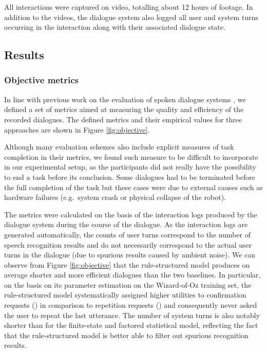 All interactions were captured on video, totalling about 12 hours of footage. In addition to the videos, the dialogue system also logged all user and system turns occurring in the interaction along with their associated dialogue state.


\subsection{Results}
\label{sec:results-exp3}

\subsubsection*{Objective metrics}

In line with previous work on the evaluation of spoken dialogue systems \citep[see e.g.][ch. 6 for an overview]{2009Jokinen}, we defined a set of metrics aimed at measuring the quality and efficiency of the recorded dialogues.  The defined metrics and their empirical values for three approaches are shown in Figure \ref{fig:objective}.

Although many evaluation schemes also include explicit measures of task completion in their metrics, we found such measure to be difficult to incorporate in our experimental setup, as the participants did not really have the possibility to end a task before its conclusion. Some dialogues had to be terminated before the full completion of the task but these cases were due to external causes such as hardware failures (e.g.\ system crash or physical collapse of the robot).
 
The metrics were calculated on the basis of the interaction logs produced by the dialogue system during the course of the dialogue. As the interaction logs are generated automatically, the counts of user turns correspond to the number of speech recognition results and do not necessarily correspond to the actual user turns in the dialogue (due to spurious results caused by ambient noise). We can observe from Figure \ref{fig:objective} that the rule-structured model produces on average shorter and more efficient dialogues than the two baselines.  In particular, on the basis on its parameter estimation on the Wizard-of-Oz training set, the rule-structured model systematically assigned higher utilities to confirmation requests () in comparison to repetition requests () and 
consequently never asked the user to repeat the last utterance. The number of system turns is also notably shorter than for the finite-state and factored statistical model, reflecting the fact that the rule-structured model is better able to filter out spurious recognition results. 

